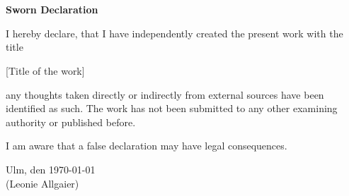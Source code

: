 

\chapter*{}
\begin{center}
\large\textbf{Sworn Declaration}
\end{center}

\vspace*{1cm}
\onehalfspacing
\noindent

I hereby declare, that I have independently created the present work with the title\\

\begin{center}
[Title of the work]
\end{center}

any thoughts taken directly or indirectly from external sources have been identified as such. The work has not been submitted to any other examining authority or published before.

\noindent
I am aware that a false declaration may have legal consequences.

\vspace{3cm}
\noindent Ulm, den \today \hspace{4cm}\hrulefill\\
\vspace*{0.5cm}
\hspace*{10.0cm} (Leonie Allgaier)

